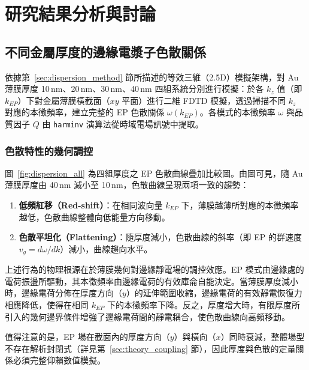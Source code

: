 
\chapter{研究結果分析與討論}

\section{不同金屬厚度的邊緣電漿子色散關係}
\label{sec:result_dispersion}

依據第~\ref{sec:dispersion_method} 節所描述的等效三維（2.5D）模擬架構，對 Au 薄膜厚度 10\,nm、20\,nm、30\,nm、40\,nm 四組系統分別進行模擬：於各 $k_z$ 值（即 $k_{EP}$）下對金屬薄膜橫截面（$xy$ 平面）進行二維 FDTD 模擬，透過掃描不同 $k_z$ 對應的本徵頻率，建立完整的 EP 色散關係 $\omega(k_{EP})$。各模式的本徵頻率 $\omega$ 與品質因子 $Q$ 由 \texttt{harminv} 演算法從時域電場訊號中提取。

\subsection{色散特性的幾何調控}
\label{sec:result_dispersion_geo}

圖~\ref{fig:dispersion_all} 為四組厚度之 EP 色散曲線疊加比較圖。由圖可見，隨 Au 薄膜厚度由 40\,nm 減小至 10\,nm，色散曲線呈現兩項一致的趨勢：

\begin{enumerate}
	\item \textbf{低頻紅移（Red-shift）}：在相同波向量 $k_{EP}$ 下，薄膜越薄所對應的本徵頻率越低，色散曲線整體向低能量方向移動。
	\item \textbf{色散平坦化（Flattening）}：隨厚度減小，色散曲線的斜率（即 EP 的群速度 $v_g = d\omega/dk$）減小，曲線趨向水平。
\end{enumerate}

上述行為的物理根源在於薄膜幾何對邊緣靜電場的調控效應。EP 模式由邊緣處的電荷振盪所驅動，其本徵頻率由邊緣電荷的有效庫侖自能決定。當薄膜厚度減小時，邊緣電荷分佈在厚度方向（$y$）的延伸範圍收縮，邊緣電荷的有效靜電恢復力相應降低，使得在相同 $k_{EP}$ 下的本徵頻率下降。反之，厚度增大時，有限厚度所引入的幾何邊界條件增強了邊緣電荷間的靜電耦合，使色散曲線向高頻移動。

值得注意的是，EP 場在截面內的厚度方向（$y$）與橫向（$x$）同時衰減，整體場型不存在解析封閉式（詳見第~\ref{sec:theory_coupling} 節），因此厚度與色散的定量關係必須完整仰賴數值模擬。

